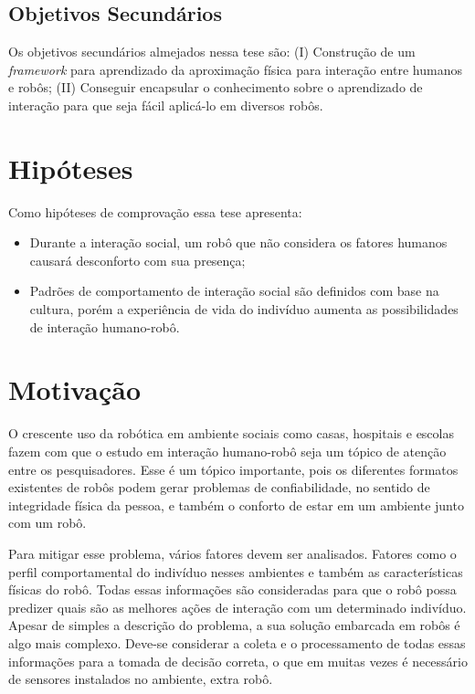 \subsection{Objetivos Secundários}
Os objetivos secundários almejados nessa tese são: (I) Construção de um \emph{framework} para aprendizado da aproximação física para interação entre humanos e robôs; (II) Conseguir encapsular o conhecimento sobre o aprendizado de interação para que seja fácil aplicá-lo em diversos robôs.

\section{Hipóteses}
Como hipóteses de comprovação essa tese apresenta:

\begin{itemize}
    \item Durante a interação social, um robô que não considera os fatores humanos causará desconforto com sua presença;
    \item Padrões de comportamento de interação social são definidos com base na cultura, porém a experiência de vida do indivíduo aumenta as possibilidades de interação humano-robô.
\end{itemize}

\section{Motivação}
O crescente uso da robótica em ambiente sociais como casas, hospitais e escolas fazem com que o estudo em interação humano-robô seja um tópico de atenção entre os pesquisadores. Esse é um tópico importante, pois os diferentes formatos existentes de robôs podem gerar problemas de confiabilidade, no sentido de integridade física da pessoa, e também o conforto de estar em um ambiente junto com um robô.

Para mitigar esse problema, vários fatores devem ser analisados. Fatores como o perfil comportamental do indivíduo nesses ambientes e também as características físicas do robô. Todas essas informações são consideradas para que o robô possa predizer quais são as melhores ações de interação com um determinado indivíduo. Apesar de simples a descrição do problema, a sua solução embarcada em robôs é algo mais complexo. Deve-se considerar a coleta e o processamento de todas essas informações para a tomada de decisão correta, o que em muitas vezes é necessário de sensores instalados no ambiente, extra robô.

